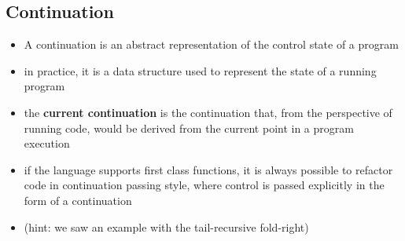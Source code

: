 \subsection{Continuation}
\begin{itemize}
    \item A continuation is an abstract representation of the control state of a program
    \item in practice, it is a data structure used to represent the state of a running program
    \item the \textbf{current continuation} is the continuation that, from the perspective of running code, would be derived from the current point in a program execution
    \item if the language supports first class functions, it is always possible to refactor code in continuation passing style, where control is passed explicitly in the form of a continuation
    \item (hint: we saw an example with the tail-recursive fold-right)
\end{itemize}

